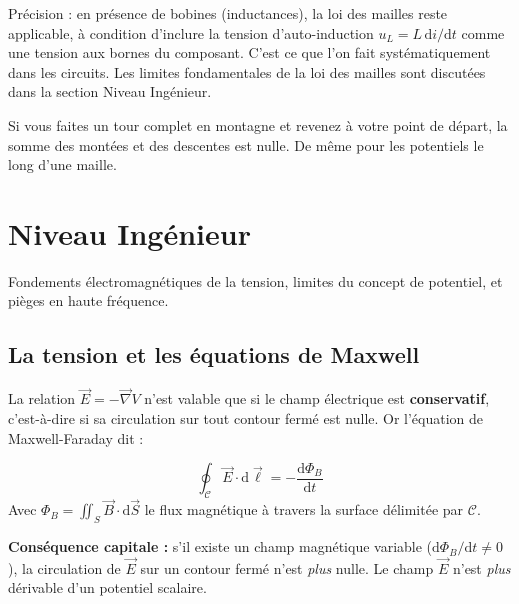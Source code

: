 \documentclass[12pt,a4paper,twoside]{book}
\begin{document}
\begin{attention}
Précision : en présence de bobines (inductances), la loi des mailles reste applicable, à condition d'inclure la tension d'auto-induction $u_L = L\,\mathrm{d}i/\mathrm{d}t$ comme une tension aux bornes du composant. C'est ce que l'on fait systématiquement dans les circuits. Les limites fondamentales de la loi des mailles sont discutées dans la section Niveau Ingénieur.
\end{attention}

\begin{analogie}
Si vous faites un tour complet en montagne et revenez à votre point de départ, la somme des montées et des descentes est nulle. De même pour les potentiels le long d'une maille.
\end{analogie}

\section{Niveau Ingénieur}

\begin{ingenieur}
Fondements électromagnétiques de la tension, limites du concept de potentiel, et pièges en haute fréquence.
\end{ingenieur}

\subsection{La tension et les équations de Maxwell}

La relation $\vec{E} = -\vec{\nabla}V$ n'est valable que si le champ électrique est \textbf{conservatif}, c'est-à-dire si sa circulation sur tout contour fermé est nulle. Or l'équation de Maxwell-Faraday dit :

\begin{formule}
\[
\boxed{\oint_{\mathcal{C}} \vec{E}\cdot\mathrm{d}\vec{\ell} = -\frac{\mathrm{d}\Phi_B}{\mathrm{d}t}}
\]
Avec $\Phi_B = \iint_S \vec{B}\cdot\mathrm{d}\vec{S}$ le flux magnétique à travers la surface délimitée par $\mathcal{C}$.
\end{formule}

\textbf{Conséquence capitale :} s'il existe un champ magnétique variable ($\mathrm{d}\Phi_B/\mathrm{d}t \neq 0$), la circulation de $\vec{E}$ sur un contour fermé n'est \textit{plus} nulle. Le champ $\vec{E}$ n'est \textit{plus} dérivable d'un potentiel scalaire.
\end{document}
